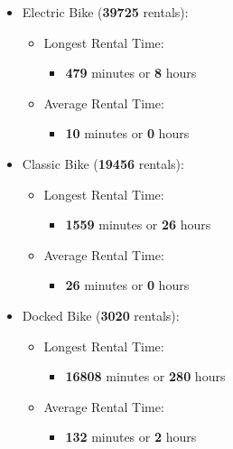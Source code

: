 \documentclass[
]{article}
\providecommand{\tightlist}{%
  \setlength{\itemsep}{0pt}\setlength{\parskip}{0pt}}
\begin{document}
\begin{itemize}
\tightlist
\item
  Electric Bike (\textbf{39725} rentals):

  \begin{itemize}
  \tightlist
  \item
    Longest Rental Time:

    \begin{itemize}
    \tightlist
    \item
      \textbf{479} minutes or \textbf{8} hours
    \end{itemize}
  \item
    Average Rental Time:

    \begin{itemize}
    \tightlist
    \item
      \textbf{10} minutes or \textbf{0} hours
    \end{itemize}
  \end{itemize}
\item
  Classic Bike (\textbf{19456} rentals):

  \begin{itemize}
  \tightlist
  \item
    Longest Rental Time:

    \begin{itemize}
    \tightlist
    \item
      \textbf{1559} minutes or \textbf{26} hours
    \end{itemize}
  \item
    Average Rental Time:

    \begin{itemize}
    \tightlist
    \item
      \textbf{26} minutes or \textbf{0} hours
    \end{itemize}
  \end{itemize}
\item
  Docked Bike (\textbf{3020} rentals):

  \begin{itemize}
  \tightlist
  \item
    Longest Rental Time:

    \begin{itemize}
    \tightlist
    \item
      \textbf{16808} minutes or \textbf{280} hours
    \end{itemize}
  \item
    Average Rental Time:

    \begin{itemize}
    \tightlist
    \item
      \textbf{132} minutes or \textbf{2} hours
    \end{itemize}
  \end{itemize}
\end{itemize}
\end{document}
